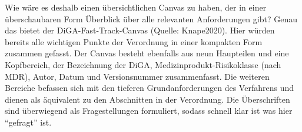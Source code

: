 Wie wäre es deshalb einen übersichtlichen Canvas zu haben, der in einer überschaubaren Form Überblick über alle relevanten Anforderungen gibt? Genau das bietet der DiGA-Fast-Track-Canvas (Quelle: Knape2020).
Hier würden bereits alle wichtigen Punkte der Verordnung in einer kompakten Form zusammen gefasst.
Der Canvas besteht ebenfalls aus neun Haupteilen und eine Kopfbereich, der Bezeichnung der DiGA, Medizinprodukt-Risikoklasse (nach MDR), Autor, Datum und Versionsnummer zusammenfasst. Die weiteren Bereiche befassen sich mit den tieferen Grundanforderungen des Verfahrens und dienen als äquivalent zu den Abschnitten in der Verordnung. Die Überschriften sind überwiegend als Fragestellungen formuliert, sodass schnell klar ist was hier ``gefragt'' ist.
